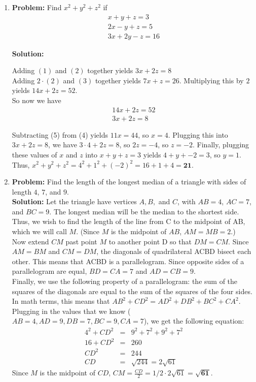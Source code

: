 \documentclass{article}
\begin{document}
\begin{enumerate}
\item \textbf{Problem:} Find $x^2 + y^2 + z^2$ if
\begin{eqnarray}
x + y + z = 3 \\
2x - y + z = 5 \\
3x + 2y - z = 16
\end{eqnarray}

\textbf{Solution:}

Adding $(1)$ and $(2)$ together yields $3x + 2z = 8$ \\

Adding $2 \cdot (2)$ and $(3)$ together yields $7x + z = 26$.  Multiplying this by $2$ yields $14x + 2z = 52$. \\

So now we have
\begin{eqnarray}
14x + 2z = 52 \\
3x + 2z = 8
\end{eqnarray}

Subtracting (5) from (4) yields $11x = 44$, so $x = 4$.  Plugging this into $3x + 2z = 8$, we have $3 \cdot 4 + 2z = 8$, so $2z = -4$, so $z = -2$.  Finally, plugging these values of $x$ and $z$ into $x + y + z = 3$ yields $4 + y + -2 = 3$, so $y = 1$.  Thus, $x^2 + y^2 + z^2 = 4^2 + 1^2 + (-2)^2 = 16 + 1 + 4 = \mathbf{21}$.

\item \textbf{Problem:} Find the length of the longest median of a triangle with sides of length $4$, $7$, and $9$.  \\

\textbf{Solution:} Let the triangle have vertices $A, B,$ and $C$, with $AB = 4$, $AC = 7$, and $BC = 9$.  The longest median will be the median to the shortest side.  Thus, we wish to find the length of the line from C to the midpoint of AB, which we will call $M$.  (Since $M$ is the midpoint of $AB$, $AM = MB = 2$.) \\

Now extend $CM$ past point $M$ to another point D so that $DM = CM$.   Since $AM = BM$ and $CM = DM$, the diagonals of quadrilateral ACBD bisect each other.  This means that ACBD is a parallelogram.  Since opposite sides of a parallelogram are equal, $BD = CA = 7$ and $AD = CB = 9$. \\

Finally, we use the following property of a parallelogram: the sum of the squares of the diagonals are equal to the sum of the squares of the four sides.  In math terms, this means that $AB^2 + CD ^2 = AD^2 + DB^2 + BC^2 + CA^2$.  Plugging in the values that we know ($AB = 4, AD = 9, DB = 7, BC = 9, CA = 7$), we get the following equation: \\
\begin{eqnarray*}
4^2 + CD^2 &=& 9^2 + 7^2 + 9^2 + 7^2 \\
16 + CD^2 &=& 260 \\
CD^2 &=& 244 \\
CD &=& \sqrt{244} = 2\sqrt{61}
\end{eqnarray*}
Since $M$ is the midpoint of $CD$, $CM = \frac{CD}{2} = 1/2 \cdot 2 \sqrt{61} = \mathbf{\sqrt{61}}$.



\end{enumerate}
\end{document}
